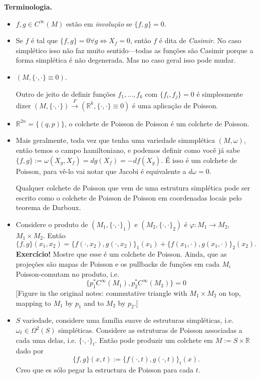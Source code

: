 \medskip\noindent
{\bf Terminologia.}
\begin{itemize}
\item $f,g \in C^\infty(M)$ estão em
\emph{involução} se $\{f,g\}=0$.
\item Se $f$ é tal que $\{f,g\}=0 \forall g
\iff X_f=0$, então $f$ é dita de
\emph{Casimir}. No caso simplético isso não
faz muito sentido---todas as funções são
Casimir porque a forma simplética é não
degenerada. Mas no caso geral isso pode
mudar.
\end{itemize}

\begin{example}
\label{example-bursztyn-poisson-brackets}
\begin{itemize}
\item $(M,\{\cdot ,\cdot \}\equiv0)$.

Outro de jeito de definir funções
$f_1,\ldots,f_k$ com $\{f_i,f_j\}=0$ é
simplesmente dizer $(M,\{\cdot ,\cdot
\})\xrightarrow{F}(\mathbb{R}^k,\{\cdot
,\cdot \} \equiv 0)$ é uma aplicação de
Poisson.
\item $\mathbb{R}^{2n}=\{(q,p)\}$, o colchete
de Poisson de Poisson é um colchete de
Poisson.
\item Mais geralmente, toda vez que tenha uma
variedade simmplética $(M,\omega)$, então
temos o campo hamiltoniano, e podemos definir
como você já sabe
$\{f,g\}:=\omega(X_g,X_f)=dg(X_f)=-df(X_g)$.
É isso é um colchete de Poisson, para vê-lo
vai notar que Jacobi é equivalente a
$d\omega=0$.

Qualquer colchete de Poisson que vem de uma
estrutura simplética pode ser escrito como o
colchete de Poisson de Poisson em coordenadas
locais pelo teorema de Darboux.

\item Considere o produto de $(M_1,\{\cdot
,\cdot \}_1)$ e $(M_2,\{ \cdot ,\cdot \}_2)$
é $\varphi:M_1 \to M_2$, $M_1 \times M_2$.
Então
$$
\{f,g\}(x_1,x_2)=\{f(\cdot ,x_2),g(\cdot
,x_2)\}_1(x_1)+\{f(x_1,\cdot ),g(x_1,\cdot
)\}_2(x_2).
$$
{\bf Exercício!} Mostre que esse é um
colchete de Poisson. Ainda, que as projeções
são mapas de Poisson e os pullbacks de
funções em cada $M_i$ Poisson-comutam no
produto, i.e.
$$
\{p_1^*C^\infty(M_1),p_2^*C^\infty(M_2)\}=0
$$
[Figure in the original notes: commutative
triangle with $M_1 \times M_2$ on top,
mapping to $M_1$ by $p_1$ and to $M_2$ by
$p_2$.]
\item $S$ variedade, considere uma família
suave de estruturas simpléticas, i.e.
$\omega_t \in \Omega^2(S)$ simpléticas.
Considere as estruturas de Poisson associadas
a cada uma delas, i.e. $\{\cdot ,\cdot \}_t$.
Então pode produzir um colchete em $M:=S
\times \mathbb{R}$ dado por
$$
\{f,g\}(x,t):=\{f(\cdot ,t),g(\cdot
,t)\}_t(x).
$$
Creo que es sólo pegar la estructura de
Poisson para cada $t$.
\end{itemize}
\end{example}

